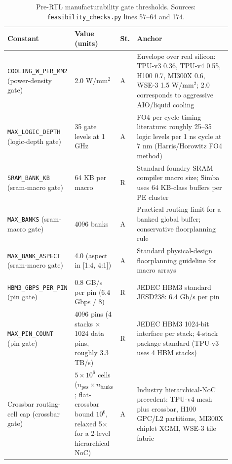 \begin{table}[h]
\centering
\footnotesize
\begin{tabular}{@{}p{0.26\linewidth}p{0.17\linewidth}p{0.045\linewidth}p{0.42\linewidth}@{}}
\toprule
Constant & Value (units) & St. & Anchor \\
\midrule
\texttt{COOLING\_W\_PER\_MM2} (power-density gate) & 2.0 W/$\mathrm{mm}^2$ & A & Envelope over real silicon: TPU-v3 0.36, TPU-v4 0.55, H100 0.7, MI300X 0.6, WSE-3 1.5 W/$\mathrm{mm}^2$; 2.0 corresponds to aggressive AIO/liquid cooling \\
\texttt{MAX\_LOGIC\_DEPTH} (logic-depth gate) & 35 gate levels at 1 GHz & A & FO4-per-cycle timing literature: roughly 25--35 logic levels per 1 ns cycle at 7 nm (Harris/Horowitz FO4 method) \\
\texttt{SRAM\_BANK\_KB} (sram-macro gate) & 64 KB per macro & R & Standard foundry SRAM compiler macro size; Simba uses 64 KB-class buffers per PE cluster \citep{shao2019simba} \\
\texttt{MAX\_BANKS} (sram-macro gate) & 4096 banks & A & Practical routing limit for a banked global buffer; conservative floorplanning rule \\
\texttt{MAX\_BANK\_ASPECT} (sram-macro gate) & 4.0 (aspect in [1:4, 4:1]) & A & Standard physical-design floorplanning guideline for macro arrays \\
\texttt{HBM3\_GBPS\_PER\_PIN} (pin gate) & 0.8 GB/s per pin (6.4 Gbps / 8) & R & JEDEC HBM3 standard JESD238: 6.4 Gb/s per pin \\
\texttt{MAX\_PIN\_COUNT} (pin gate) & 4096 pins (4 stacks $\times$ 1024 data pins, roughly 3.3 TB/s) & R & JEDEC HBM3 1024-bit interface per stack; 4-stack package standard (TPU-v3 uses 4 HBM stacks) \citep{jouppi2021ten} \\
Crossbar routing-cell cap (crossbar gate) & $5\times10^6$ cells ($n_{\mathrm{pes}} \times n_{\mathrm{banks}}$; flat-crossbar bound $10^6$, relaxed 5$\times$ for a 2-level hierarchical NoC) & A & Industry hierarchical-NoC precedent: TPU-v4 mesh plus crossbar, H100 GPC/L2 partitions, MI300X chiplet XGMI, WSE-3 tile fabric \citep{jouppi2021ten} \\
\bottomrule
\end{tabular}
\caption{Pre-RTL manufacturability gate thresholds. Sources: \texttt{feasibility\_checks.py} lines 57--64 and 174.}
\label{tab:coeff_gates}
\end{table}

